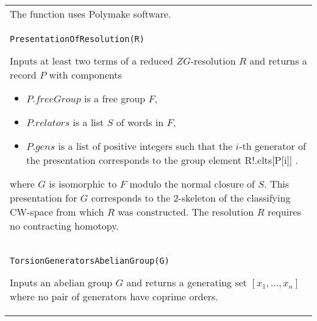 \documentclass[a4paper,11pt]{report}
\begin{document}
{\begin{center}
\begin{tabular}{|l|}
 The function uses Polymake software. \\
 \index{PresentationOfResolution} \texttt{PresentationOfResolution(R) } 

 Inputs at least two terms of a reduced $ZG$-resolution $R$ and returns a record $P$ with components 
\begin{itemize}
\item  $P.freeGroup$ is a free group $F$, 
\item  $P.relators$ is a list $S$ of words in $F$, 
\item  $P.gens$ is a list of positive integers such that the $i$-th generator of the presentation corresponds to the group element
R!.elts[P[i]] . 
\end{itemize}
 where $G$ is isomorphic to $F$ modulo the normal closure of $S$. This presentation for $G$ corresponds to the 2-skeleton of the classifying CW-space from which $R$ was constructed. The resolution $R$ requires no contracting homotopy. \\
 \index{TorsionGeneratorsAbelianGroup} \texttt{TorsionGeneratorsAbelianGroup(G) } 

 Inputs an abelian group $G$ and returns a generating set $[x_1, \ldots ,x_n]$ where no pair of generators have coprime orders. \\
\end{tabular}\\[2mm]
\end{center}

 }

 
\end{document}
